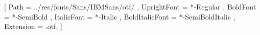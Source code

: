 \setsansfont{IBMPlexSans}
[
	Path = ../res/fonts/Sans/IBMSans/otf/ ,
	UprightFont = *-Regular ,
	BoldFont = *-SemiBold ,
	ItalicFont = *-Italic ,
	BoldItalicFont = *-SemiBoldItalic ,
	Extension = .otf,
]